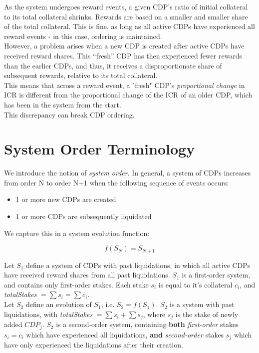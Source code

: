\documentclass[reqno]{article}
\begin{document}
As the system undergoes reward events, a given CDP’s ratio of initial collateral to its total collateral shrinks. Rewards are based on a smaller and smaller share of the total collateral. This is fine, as long as all active CDPs have experienced all reward events - in this case, ordering is maintained.\\

However, a problem arises when a new CDP is created after active CDPs have received reward shares.  This “fresh” CDP has then experienced fewer rewards than the earlier CDPs, and thus, it receives a disproportionate share of subsequent rewards, relative to its total collateral.\\

This means that across a reward event, a "fresh" CDP’s \textit{proportional change} in ICR is different from the proportional change of the ICR of an older CDP, which has been in the system from the start.\\

This discrepancy can break CDP ordering.\\

\section{System Order Terminology}

We introduce the notion of \textit{system order}. In general, a system of CDPs increases from order N to order N+1 when the following sequence of events occurs:

\begin{itemize}
  \item 1 or more new CDPs are created 
  \item 1 or more CDPs are subsequently liquidated
\end{itemize}

We capture this in a system evolution function:

\begin{equation} 
    f(S_N)=S_{N+1}
\end{equation}

\bigskip
Let $S_1$ define a system of CDPs with past liquidations, in which all active CDPs have received reward shares from all past liquidations. $S_1$ is a first-order system, and contains only first-order stakes. Each stake $s_i$ is equal to it’s collateral $c_i$, and \textit{totalStakes} $= \sum s_i = \sum c_i$.\\

Let $S_2$ define an evolution of $S_1$, i.e. $S_2 = f(S_1)$. $S_2$ is a system with past liquidations, with \textit{totalStakes} $= \sum s_i + \sum s_j$, where $s_j$ is the stake of newly added $CDP_j$. $S_2$ is a second-order system, containing \textbf{both} \textit{first-order} stakes $s_i = c_i$ which have experienced all liquidations, \textbf{and} \textit{second-order} stakes $s_j$ which have only experienced the liquidations after their creation.\\
\end{document}
